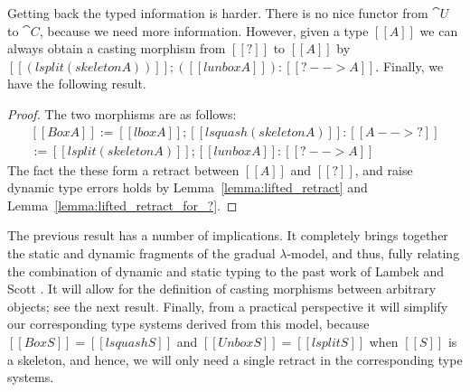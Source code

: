 Getting back the typed information is harder.  There is no nice
functor from $\cat{U}$ to $\cat{C}$, because we need more information.
However, given a type $[[A]]$ we can always obtain a casting morphism
from $[[?]]$ to $[[A]]$ by $[[(lsplit (skeleton A))]];([[lunbox A]]) :
[[? --> A]]$.  Finally, we have the following result.
\begin{proof}
  The two morphisms are as follows:
  \[
  \begin{array}{lll}
    [[Box A]] := [[lbox A]];[[lsquash (skeleton A)]] : [[A --> ?]]\\
    [[Unbox A]] := [[lsplit (skeleton A)]];[[lunbox A]] : [[? --> A]]
  \end{array}
  \]
  \noindent
  The fact the these form a retract between $[[A]]$ and $[[?]]$, and
  raise dynamic type errors holds by Lemma~\ref{lemma:lifted_retract}
  and Lemma~\ref{lemma:lifted_retract_for_?}.
\end{proof}
The previous result has a number of implications.  It completely
brings together the static and dynamic fragments of the gradual
$\lambda$-model, and thus, fully relating the combination of dynamic
and static typing to the past work of Lambek and Scott
\cite{Scott:1980,Lambek:1980}.  It will allow for the definition of
casting morphisms between arbitrary objects; see the next result.
Finally, from a practical perspective it will simplify our
corresponding type systems derived from this model, because $[[Box S]]
= [[lsquash S]]$ and $[[Unbox S]] = [[lsplit S]]$ when $[[S]]$ is a
skeleton, and hence, we will only need a single retract in the
corresponding type systems.


